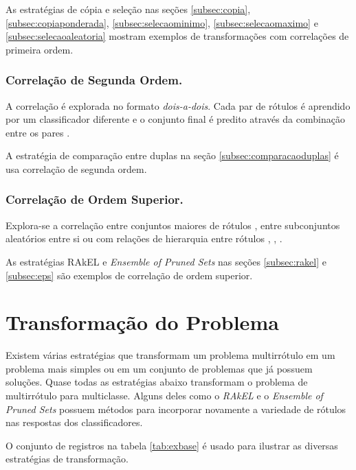 \documentclass[runningheads,a4paper]{llncs}
\begin{document}
As estratégias de cópia e seleção nas seções \ref{subsec:copia}, \ref{subsec:copiaponderada}, \ref{subsec:selecaominimo}, \ref{subsec:selecaomaximo} e \ref{subsec:selecaoaleatoria} mostram exemplos de transformações com correlações de primeira ordem.

\subsubsection{Correlação de Segunda Ordem.} \label{subsec:corr2ordem}

A correlação é explorada no formato \emph{dois-a-dois}. Cada par de rótulos é aprendido por um classificador diferente e o conjunto final é predito através da combinação entre os pares \cite{Hullermeier2008-co}.

A estratégia de comparação entre duplas na seção \ref{subsec:comparacaoduplas} é usa correlação de segunda ordem.

\subsubsection{Correlação de Ordem Superior.} \label{subsec:corrSordem}

Explora-se a correlação entre conjuntos maiores de rótulos \cite{Read2008-bt}, entre subconjuntos aleatórios entre si \cite{Tsoumakas2007-cw} ou com relações de hierarquia entre rótulos \cite{Vens2008-yp}, \cite{Cesa-Bianchi2006-fk}, \cite{Esuli2008-on}.

As estratégias RAkEL e \textit{Ensemble of Pruned Sets} nas seções \ref{subsec:rakel} e \ref{subsec:eps} são exemplos de correlação de ordem superior.

\section{Transformação do Problema}\label{sec:transprob}

Existem várias estratégias que transformam um problema multirrótulo em um problema mais simples ou em um conjunto de problemas que já possuem soluções. Quase todas as estratégias abaixo transformam o problema de multirrótulo para multiclasse. Alguns deles como o \textit{RAkEL} \cite{Tsoumakas2007-wm} e o \textit{Ensemble of Pruned Sets} \cite{Read2008-bt} possuem métodos para incorporar novamente a variedade de rótulos nas respostas dos classificadores.

O conjunto de registros na tabela \ref{tab:exbase} é usado para ilustrar as diversas estratégias de transformação.
\end{document}

